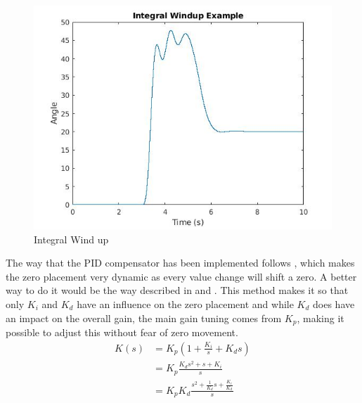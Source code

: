 \documentclass[a4paper, 11pt, compsoc]{IEEEtran}
\begin{document}
		\begin{figure}[!ht]
			\centering
			\includegraphics[width=\columnwidth]{integralWindup.jpg}
			\caption{Integral Wind up}
			\label{fig:integralWindup}
		\end{figure}
		\par
		The way that the PID compensator has been implemented follows , which makes the zero placement very dynamic as every value change will shift a zero. A better way to do it would be the way described in \cite{elprocus} and . This method makes it so that only $K_i$ and $K_d$ have an influence on the zero placement and while $K_d$ does have an impact on the overall gain, the main gain tuning comes from $K_p$, making it possible to adjust this without fear of zero movement.
		\begin{equation}
			\label{eq:pideq2}
			\begin{split}
				K(s) & = K_p(1 + \frac{K_i}{s} + K_ds)\\
					 & = K_p\frac{K_ds^2 + s + K_i}{s}\\
					 & = K_pK_d\frac{s^2 +\frac{1}{K_d}s + \frac{K_i}{K_d}}{s}
			\end{split}
		\end{equation}
		\par
\end{document}
